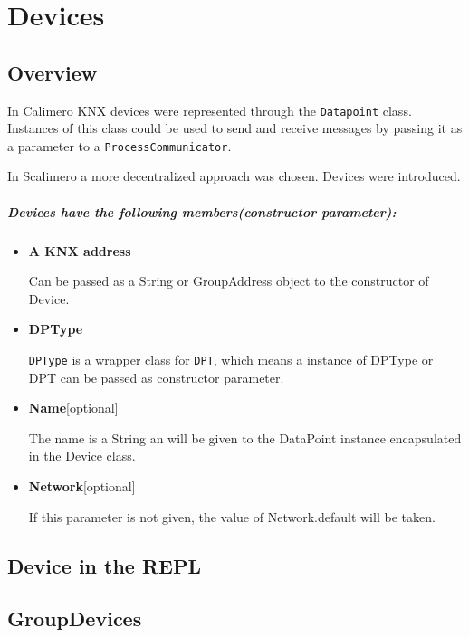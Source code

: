 \chapter{Devices}
\section{Overview}

In Calimero KNX devices were represented through the \lstinline!Datapoint! class. Instances of this class could be used to send and receive messages by passing it as a parameter to a \lstinline!ProcessCommunicator!.

In Scalimero a more decentralized approach was chosen. Devices were introduced.

\paragraph{Devices have the following members(constructor parameter):}
\begin{itemize}
  \item \textbf{A KNX address}
  
    Can be passed as a String or GroupAddress object to the constructor of Device.
  \item \textbf{DPType}
  
    \lstinline{DPType} is a wrapper class for \lstinline{DPT}, which means a instance of DPType or DPT can be passed as constructor parameter.
  \item \textbf{Name}[optional]
  
    The name is a String an will be given to the DataPoint instance encapsulated in the Device class.
  \item \textbf{Network}[optional]
  
    If this parameter is not given, the value of Network.default will be taken.
\end{itemize}
\section{Device in the REPL}

\section{GroupDevices}
